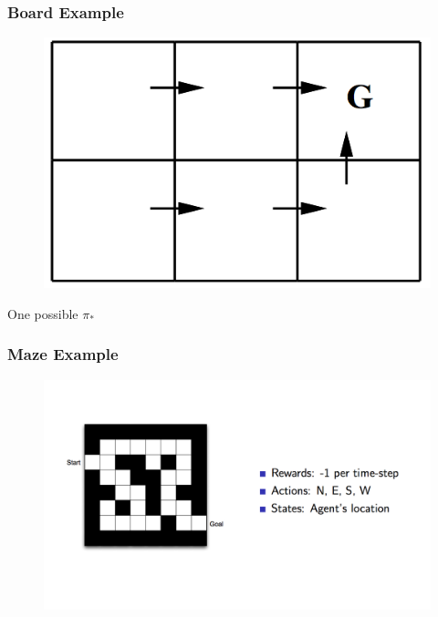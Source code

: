 \documentclass{beamer}
\begin{document}
\begin{frame}
\frametitle{Board Example}
\begin{figure}[t]
\includegraphics[scale=0.3]{Board4}
\centering
\end{figure}
One possible $\pi_*$
\centering
\end{frame}




\begin{frame}
\frametitle{Maze Example}
\begin{figure}[t]
\includegraphics[scale=0.3]{Maze1}
\centering
\end{figure}
\end{frame}

\end{document}
